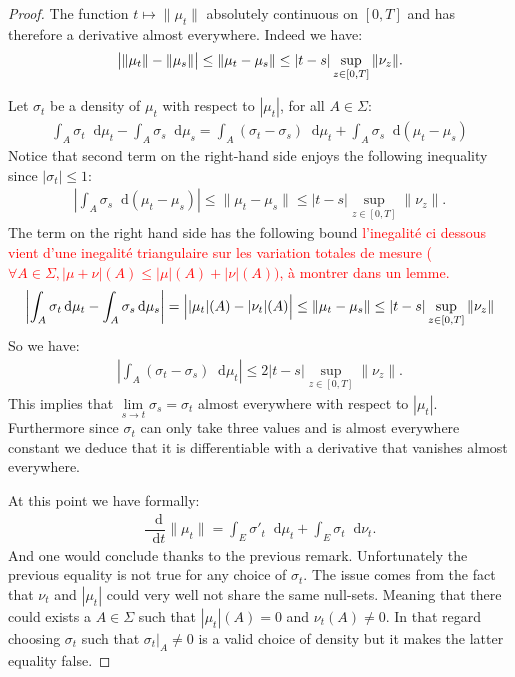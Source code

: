 \documentclass[11pt,a4paper]{article}
\newcommand{\red}[1]{\textcolor{red}{#1}}
\newcommand{\dd}{\mathop{}\!\mathrm{d}}
\begin{document}
\begin{proof}
    The function $t \mapsto \|\mu_t\|$ absolutely continuous on $[0,T]$ and has therefore a derivative almost everywhere. Indeed we have:
    \begin{align}\label{proof:kolokol_lemma-absolute-continuous}
       \left\lvert \vphantom{A^2}\| \mu_t \| - \|\mu_s\|\right\rvert \leq \|\mu_t - \mu_s \| \leq |t-s|\sup\limits_{z \in [0,T]} \|\nu_z\|.
    \end{align}
    
    Let $\sigma_t$ be a density of $\mu_t$ with respect to $|\mu_t|$, for all $A \in \Sigma$:
    \begin{align*}
        \int_A\sigma_{t } \dd \mu_{t} - \int_A \sigma_{s} \dd\mu_{s} = \int_A (\sigma_{t}-\sigma_s)\dd\mu_{t }  + \int_A \sigma_s \dd(\mu_{t } - \mu_s)
    \end{align*}
    Notice that second term on the right-hand side enjoys the following inequality since $|\sigma_t| \leq 1$:
    \begin{align*}
        \left\lvert \int_A \sigma_s \dd(\mu_{t } - \mu_s) \right\rvert\leq \|\mu_t - \mu_s \| \leq |t-s|\sup\limits_{z \in [0,T]} \|\nu_z\|.
    \end{align*}
    The term on the right hand side has the following bound 
    \red{l'inegalité ci dessous vient d'une inegalité triangulaire sur les variation totales de mesure ($\forall A \in \Sigma, |\mu + \nu|(A) \leq |\mu|(A) + |\nu|(A))$, à montrer dans un lemme.}
    \begin{align*}
        \left\lvert \int_A\sigma_{t } \dd \mu_{t} - \int_A \sigma_{s} \dd\mu_{s} \right\rvert = \left\lvert \vphantom{A^{2^2}}|\mu_t|(A) -|\nu_t|(A) \right\rvert \leq \| \mu_{t } - \mu_s \| \leq |t-s|\sup\limits_{z \in [0,T]} \|\nu_z\|
    \end{align*}
    So we have:
    \begin{align*}
        \left\lvert \int_A (\sigma_{t}-\sigma_s)\dd\mu_{t } \right\rvert\leq 2|t-s|\sup\limits_{z \in [0,T]} \|\nu_z\|.
    \end{align*}
    This implies that $\lim\limits_{s \to t} \sigma_s = \sigma_t$ almost everywhere with respect to $|\mu_t|$. Furthermore since $\sigma_t$ can only take three values and is almost everywhere constant we deduce that it is differentiable with a derivative that vanishes almost everywhere.
    
    At this point we have formally:
    \begin{align*}
        \dfrac{\dd}{\dd t} \| \mu_t \| = \int_E\sigma'_t \dd \mu_t + \int_E \sigma_t \dd \nu_t. 
    \end{align*}
    And one would conclude thanks to the previous remark. Unfortunately the previous equality is not true for any choice of $\sigma_t$. The issue comes from the fact that $\nu_t$ and $|\mu_t|$ could very well not share the same null-sets. Meaning that there could exists a $A  \in \Sigma$ such that $|\mu_t|(A) = 0$ and $\nu_t(A) \neq 0$. In that regard choosing $\sigma_t$ such that $\sigma_t|_A \neq 0$ is a valid choice of density but it makes the latter equality false.


\end{proof}
\end{document}
